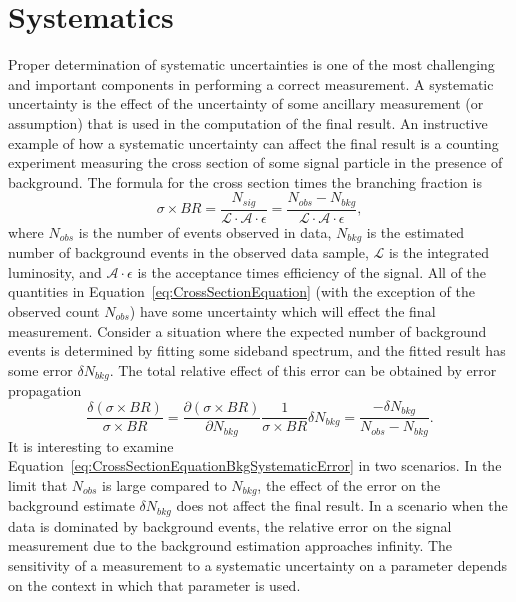 \ifx\master\undefined\fi

\chapter{Systematics} \label{ch:systematics} Proper determination of systematic
uncertainties is one of the most challenging and important components in
performing a correct measurement.  A systematic uncertainty is the effect of the
uncertainty of some ancillary measurement (or assumption) that is used in the
computation of the final result.  An instructive example of how a systematic
uncertainty can affect the final result is a counting experiment measuring the cross
section of some signal particle in the presence of background.  The formula for
the cross section times the branching fraction is
\begin{equation}
  \sigma \times BR = \frac{N_{sig}}{\mathcal{L} \cdot \mathcal {A} \cdot
  \epsilon} = \frac{N_{obs}-N_{bkg}}{\mathcal{L} \cdot \mathcal {A} \cdot
  \epsilon}, \label{eq:CrossSectionEquation}
\end{equation}
where $N_{obs}$ is the number of events observed in data, $N_{bkg}$ is the
estimated number of background events in the observed data sample, $\mathcal{L}$
is the integrated luminosity, and $\mathcal{A} \cdot \epsilon$ is the acceptance
times efficiency of the signal.  All of the quantities in
Equation~\ref{eq:CrossSectionEquation} (with the exception of the observed
count $N_{obs}$) have some uncertainty which will effect the final measurement.
Consider a situation where the expected number of background events is
determined by fitting some sideband spectrum, and the fitted result has some
error $\delta N_{bkg}$.  The total relative effect of this error can
be obtained by error propagation
\begin{equation}
  \frac{\delta (\sigma \times BR)}{\sigma \times BR} = \frac{\partial(\sigma
  \times BR)}{\partial N_{bkg}}  \frac{1}{\sigma \times BR} \delta N_{bkg} =
  \frac{-\delta N_{bkg}} {N_{obs}-N_{bkg}}.
  \label{eq:CrossSectionEquationBkgSystematicError}
\end{equation}
It is interesting to examine
Equation~\ref{eq:CrossSectionEquationBkgSystematicError} in two scenarios.  In
the limit that $N_{obs}$ is large compared to $N_{bkg}$, the effect of the error
on the background estimate $\delta N_{bkg}$ does not affect the final result.
In a scenario when the data is dominated by background events, the relative
error on the signal measurement due to the background estimation approaches
infinity.  The sensitivity of a measurement to a systematic uncertainty on a
parameter depends on the context in which that parameter is used.


